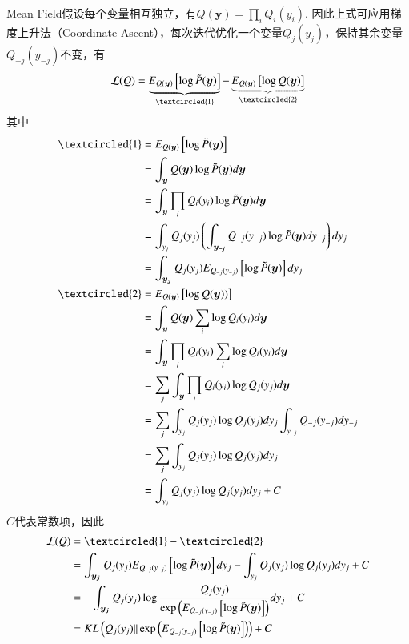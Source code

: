 Mean Field假设每个变量相互独立，有$Q(\boldsymbol{y})=\prod_i{Q_i(y_i)}$. 因此上式可应用梯度上升法（Coordinate Ascent），每次迭代优化一个变量$Q_j(y_j)$，保持其余变量$Q_{-j}(y_{-j})$不变，有
\begin{equation}
  \mathcal{L}(Q)=\underbrace{E_{Q(\boldsymbol{y})}\left[\log \tilde{P}(\boldsymbol{y})\right]}_{\textcircled{1}}-\underbrace{E_{Q(\boldsymbol{y})}\left[\log Q(\boldsymbol{y})\right]}_{\textcircled{2}}
\end{equation}
其中
\begin{equation}
  \begin{split}
    \textcircled{1}&=E_{Q(\boldsymbol{y})}\left[\log \tilde{ P}(\boldsymbol{y})\right]\\
    &=\int_{\boldsymbol{y}}Q(\boldsymbol{y}) \log \tilde{P}(\boldsymbol{y})d\boldsymbol{y}\\
    &=\int_{\boldsymbol{y}}\prod_i{Q_i(y_i)} \log \tilde{P}(\boldsymbol{y})d\boldsymbol{y}\\
    &=\int_{y_j}Q_j(y_j)\left(\int_{\boldsymbol{y_{-j}}}Q_{-j}(y_{-j})\log \tilde{ P}(\boldsymbol{y}) dy_{-j}\right) dy_j\\
    &=\int_{\boldsymbol{y_j}}Q_j(y_j)E_{Q_{-j}(y_{-j})}\left[\log \tilde{ P}(\boldsymbol{y}) \right] dy_j\\
    \textcircled{2}&=E_{Q(\boldsymbol{y})}\left[\log Q(\boldsymbol{y}))\right]\\
    &=\int_{\boldsymbol{y}}Q(\boldsymbol{y}) \sum_i\log Q_i(y_i) d\boldsymbol{y}\\
    &=\int_{\boldsymbol{y}}\prod_i{Q_i(y_i)} \sum_i\log Q_i(y_i) d\boldsymbol{y}\\
    &=\sum_j\int_{\boldsymbol{y}}\prod_i{Q_i(y_i)}\log Q_j(y_j) d\boldsymbol{y}\\
    &=\sum_j\int_{y_j}Q_j(y_j)\log Q_j(y_j) dy_j\int_{y_{-j}} {Q_{-j}(y_{-j})}dy_{-j}\\
    &=\sum_j\int_{y_j}Q_j(y_j)\log Q_j(y_j) dy_j\\
    &=\int_{y_j}Q_j(y_j)\log Q_j(y_j) dy_j + C
  \end{split}
\end{equation}
$C$代表常数项，因此
\begin{equation}
  \begin{split}
    \mathcal{L}(Q)&=\textcircled{1}-\textcircled{2}\\
    &=\int_{\boldsymbol{y_j}}Q_j(y_j)E_{Q_{-j}(y_{-j})}\left[\log \tilde{P}(\boldsymbol{y}) \right] dy_j-\int_{y_j}Q_j(y_j)\log Q_j(y_j) dy_j +C\\
    &=-\int_{\boldsymbol{y_j}}Q_j(y_j)\log\frac{Q_j(y_j)}{\exp\left(E_{Q_{-j}(y_{-j})}\left[\log \tilde{P}(\boldsymbol{y}) \right]\right)} dy_j +C\\
    &=KL\left(Q_j(y_j)||\exp\left(E_{Q_{-j}(y_{-j})}\left[\log \tilde{P}(\boldsymbol{y}) \right]\right)\right)+C
  \end{split}
\end{equation}
